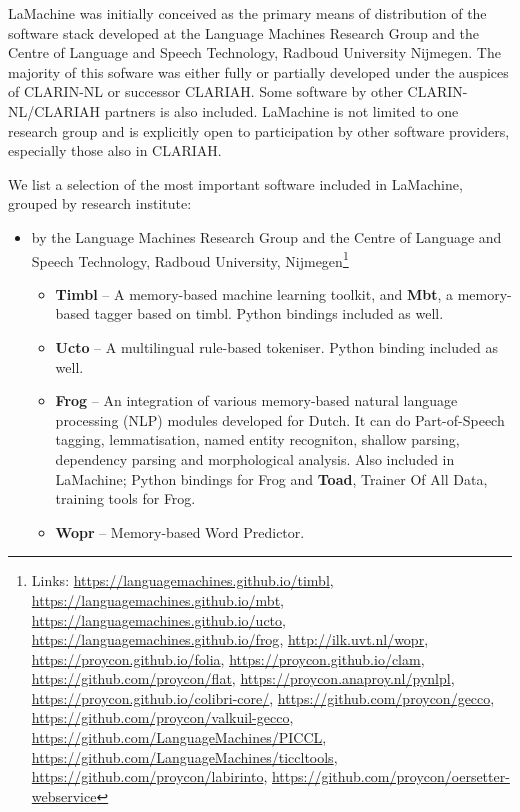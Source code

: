 \documentclass[a4paper,11pt]{article}
\begin{document}
LaMachine was initially conceived as the primary means of distribution of the software stack developed at the Language
Machines Research Group and the Centre of
Language and Speech Technology, Radboud University Nijmegen. The majority of this sofware was either fully or partially developed under the auspices of CLARIN-NL or successor
CLARIAH. Some software by other CLARIN-NL/CLARIAH partners is also included. LaMachine is not limited to one research
group and is explicitly open to participation by other software providers, especially those
also in CLARIAH.

We list a selection of the most important software included in LaMachine, grouped by research institute:

\begin{itemize}
 \item by the Language Machines Research Group and the Centre of Language and Speech Technology, Radboud University,
     Nijmegen\footnote{Links: \url{https://languagemachines.github.io/timbl}, \url{https://languagemachines.github.io/mbt},
    \url{https://languagemachines.github.io/ucto}, \url{https://languagemachines.github.io/frog},
    \url{http://ilk.uvt.nl/wopr}, \url{https://proycon.github.io/folia}, \url{https://proycon.github.io/clam},
\url{https://github.com/proycon/flat}, \url{https://proycon.anaproy.nl/pynlpl},
\url{https://proycon.github.io/colibri-core/},
\url{https://github.com/proycon/gecco},
\url{https://github.com/proycon/valkuil-gecco},
\url{https://github.com/LanguageMachines/PICCL}, \url{https://github.com/LanguageMachines/ticcltools},
\url{https://github.com/proycon/labirinto},
\url{https://github.com/proycon/oersetter-webservice}
}
 \begin{itemize}
     \item \textbf{Timbl} -- A memory-based machine learning
         toolkit, and \textbf{Mbt}, a memory-based tagger based on timbl. Python bindings included as well.
     \item \textbf{Ucto} -- A multilingual rule-based tokeniser. Python binding included as well.
     \item \textbf{Frog} -- An integration of various memory-based natural language processing (NLP) modules
         developed for Dutch. It can do Part-of-Speech tagging, lemmatisation, named entity recogniton, shallow parsing,
         dependency parsing and morphological analysis. Also included in LaMachine;
         Python bindings for Frog and \textbf{Toad}, Trainer Of All Data, training tools for Frog.
     \item \textbf{Wopr} -- Memory-based Word Predictor.

\end{itemize}
\end{itemize}
\end{document}
